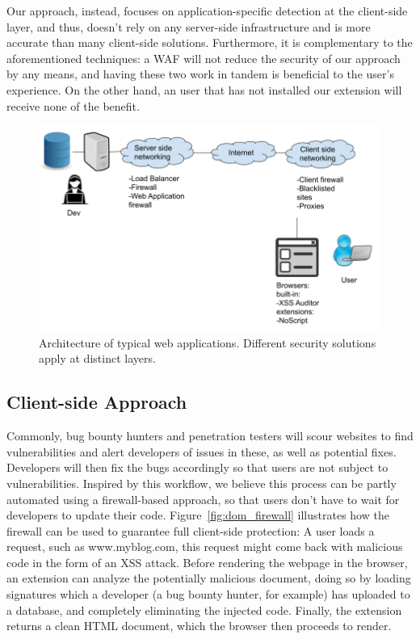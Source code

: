 Our approach, instead, focuses on application-specific detection at the client-side layer, and thus, doesn't rely on any server-side infrastructure and is more accurate than many client-side solutions. Furthermore, it is complementary to the aforementioned techniques: a WAF will not reduce the security of our approach by any means, and having these two work in tandem is beneficial to the user's experience. On the other hand, an user that has not installed our extension will receive none of the benefit.
\begin{figure}[h]
	\includegraphics[scale=0.3]{img/web_architecture.png}
	\caption{Architecture of typical web applications. Different security solutions apply at distinct layers.}
	\label{fig:web_architecture}
\end{figure}


\subsection{Client-side Approach}
 Commonly, bug bounty hunters and penetration testers will scour websites to find vulnerabilities and alert developers of issues in these, as well as potential fixes. Developers will then fix the bugs accordingly so that users are not subject to vulnerabilities. Inspired by this workflow, we believe this process can be partly automated using a firewall-based approach, so that users don't have to wait for developers to update their code. Figure~\ref{fig:dom_firewall} illustrates how the firewall can be used to guarantee full client-side protection: A user loads a request, such as www.myblog.com, this request might come back with malicious code in the form of an XSS attack. Before rendering the webpage in the browser, an extension can analyze the potentially malicious document, doing so by loading signatures which a developer (a bug bounty hunter, for example) has uploaded to a database, and completely eliminating the injected code. Finally, the extension returns a clean HTML document, which the browser then proceeds to render.
 
